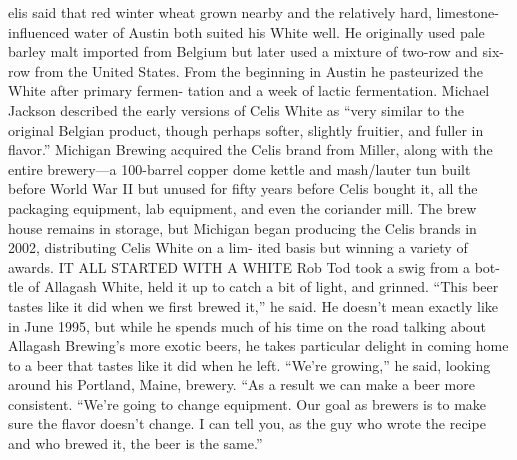 \documentclass[a4paper,parskip=half]{scrartcl}
\begin{document}
elis said that red winter wheat grown nearby and the relatively
hard, limestone-influenced water of Austin both suited his White well.
He originally used pale barley malt imported from Belgium but later
used a mixture of two-row and six-row from the United States. From
the beginning in Austin he pasteurized the White after primary fermen-
tation and a week of lactic fermentation. Michael Jackson described
the early versions of Celis White as “very similar to the original Belgian
product, though perhaps softer, slightly fruitier, and fuller in flavor.”
Michigan Brewing acquired the Celis brand from Miller, along with
the entire brewery—a 100-barrel copper dome kettle and mash/lauter
tun built before World War II but unused for fifty years before Celis
bought it, all the packaging equipment, lab equipment, and even the
coriander mill. The brew house remains in storage, but Michigan began
producing the Celis brands in 2002, distributing Celis White on a lim-
ited basis but winning a variety of awards.
IT ALL STARTED WITH A WHITE
Rob Tod took a swig from a bot-
tle of Allagash White, held it up to
catch a bit of light, and grinned.
“This beer tastes like it did when
we first brewed it,” he said. He
doesn’t mean exactly like in June
1995, but while he spends much
of his time on the road talking
about Allagash Brewing’s more
exotic beers, he takes particular
delight in coming home to a beer
that tastes like it did when he left.
“We’re growing,” he said,
looking around his Portland,
Maine, brewery. “As a result we
can make a beer more consistent.
“We’re going to change
equipment. Our goal as brewers
is to make sure the flavor doesn’t change. I can tell you, as the guy who
wrote the recipe and who brewed it, the beer is the same.”

\parencite[57]{Hieronymus2010}
\end{document}
